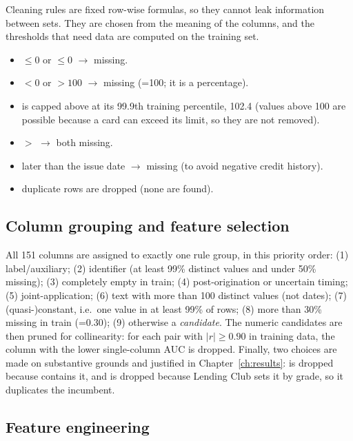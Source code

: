 Cleaning rules are fixed row-wise formulas, so they cannot leak information between sets. They are chosen from the meaning of the columns, and the thresholds that need data are computed on the training set.
\begin{itemize}
    \item {}$\le 0$ or $\le 0$ $\to$ missing.
    \item {}$<0$ or $>100$ $\to$ missing (=100; it is a percentage).
    \item {} is capped above at its 99.9th training percentile, 102.4 (values above 100 are possible because a card can exceed its limit, so they are not removed).
    \item {}$>$ $\to$ both missing.
    \item {} later than the issue date $\to$ missing (to avoid negative credit history).
    \item duplicate  rows are dropped (none are found).
\end{itemize}

\subsection{Column grouping and feature selection}
\label{sec:selection}

All 151 columns are assigned to exactly one rule group, in this priority order: (1) label/auxiliary; (2) identifier (at least 99\% distinct values and under 50\% missing); (3) completely empty in train; (4) post-origination or uncertain timing; (5) joint-application; (6) text with more than 100 distinct values (not dates); (7) (quasi-)constant, i.e.\ one value in at least 99\% of rows; (8) more than 30\% missing in train (=0.30); (9) otherwise a \emph{candidate}. The numeric candidates are then pruned for collinearity: for each pair with $|r|\ge0.90$ in training data, the column with the lower single-column AUC is dropped. Finally, two choices are made on substantive grounds and justified in Chapter~\ref{ch:results}:  is dropped because  contains it, and  is dropped because Lending Club sets it by grade, so it duplicates the incumbent.

\subsection{Feature engineering}
\label{sec:fe}

